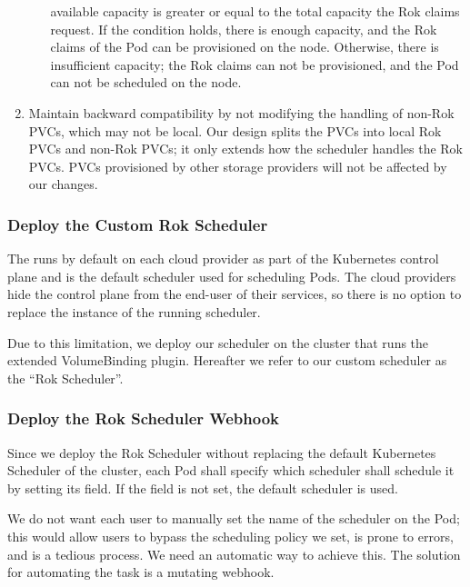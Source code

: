 \begin{enumerate}
\begin{enumerate}
                        available capacity is greater or equal to the total
                        capacity the Rok claims request. If the condition holds,
                        there is enough capacity, and the Rok claims of the Pod
                        can be provisioned on the node. Otherwise, there is
                        insufficient capacity; the Rok claims can not be
                        provisioned, and the Pod can not be scheduled on the
                        node.
            \end{enumerate}
      \item Maintain backward compatibility by not modifying the handling of
            non-Rok PVCs, which may not be local. Our design splits the PVCs
            into local Rok PVCs and non-Rok PVCs; it only extends how the
            scheduler handles the Rok PVCs. PVCs provisioned by other storage
            providers will not be affected by our changes.
\end{enumerate}


\subsubsection{Deploy the Custom Rok Scheduler}

The  runs by default on each cloud provider as part of the
Kubernetes control plane and is the default scheduler used for scheduling Pods.
The cloud providers hide the control plane from the end-user of their services,
so there is no option to replace the instance of the running scheduler.

Due to this limitation, we deploy our scheduler on the cluster that runs the
extended VolumeBinding plugin. Hereafter we refer to our custom scheduler as the
``Rok Scheduler''.


\subsubsection{Deploy the Rok Scheduler Webhook}

Since we deploy the Rok Scheduler without replacing the default Kubernetes
Scheduler of the cluster, each Pod shall specify which scheduler shall schedule
it by setting its  field. If the field is not set, the
default scheduler is used.

We do not want each user to manually set the name of the scheduler on the Pod;
this would allow users to bypass the scheduling policy we set, is prone to
errors, and is a tedious process. We need an automatic way to achieve this. The
solution for automating the task is a mutating webhook.

